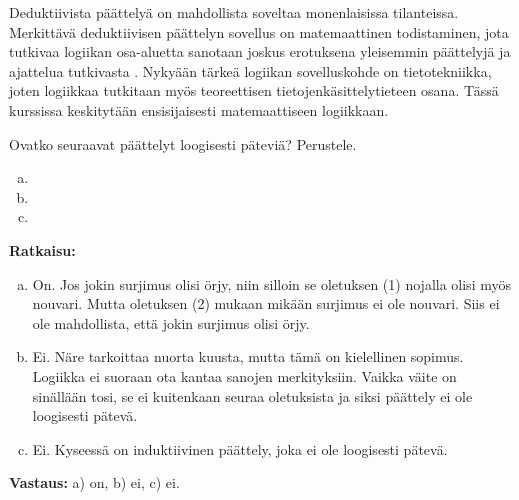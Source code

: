 Deduktiivista päättelyä on mahdollista soveltaa monenlaisissa tilanteissa.
Merkittävä deduktiivisen päättelyn sovellus on matemaattinen todistaminen,
jota tutkivaa logiikan osa-aluetta sanotaan joskus
 erotuksena
yleisemmin päättelyjä ja ajattelua tutkivasta
.
Nykyään tärkeä logiikan sovelluskohde on tietotekniikka, joten logiikkaa
tutkitaan myös teoreettisen tietojen\-käsittely\-tieteen osana.
Tässä kurssissa keskitytään ensisijaisesti matemaattiseen logiikkaan.

\begin{esimerkki} Ovatko seuraavat päättelyt loogisesti päteviä? Perustele.
    \begin{enumerate}[a)]
        \item {}
        \item {}
        \item {}
    \end{enumerate}
    \textbf{Ratkaisu:}
        \begin{enumerate}[a)]
            \item On. Jos jokin surjimus olisi örjy, niin silloin se oletuksen (1) nojalla olisi myös nouvari.
                Mutta oletuksen (2) mukaan mikään surjimus ei ole nouvari. Siis ei ole
                mahdollista, että jokin surjimus olisi örjy. 
            \item Ei. Näre tarkoittaa nuorta kuusta, mutta tämä on kielellinen sopimus.
                Logiikka ei suoraan ota kantaa sanojen merkityksiin.
                Vaikka väite on sinällään tosi, se ei kuitenkaan seuraa oletuksista ja siksi päättely ei ole loogisesti pätevä.
            \item Ei. Kyseessä on induktiivinen päättely, joka ei ole loogisesti pätevä.
        \end{enumerate}
    \textbf{Vastaus:}
        a) on, b) ei, c) ei.
\end{esimerkki}

